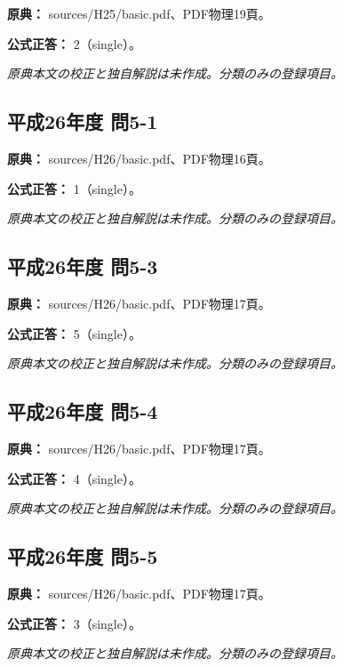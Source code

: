 \noindent\textbf{原典：} sources/H25/basic.pdf、PDF物理19頁。

\textbf{公式正答：} 2（single）。

\par\textit{原典本文の校正と独自解説は未作成。分類のみの登録項目。}

\subsection{平成26年度 問5-1}
\label{q:h26-reg-basic-5-1}

\noindent\textbf{原典：} sources/H26/basic.pdf、PDF物理16頁。

\textbf{公式正答：} 1（single）。

\par\textit{原典本文の校正と独自解説は未作成。分類のみの登録項目。}

\subsection{平成26年度 問5-3}
\label{q:h26-reg-basic-5-3}

\noindent\textbf{原典：} sources/H26/basic.pdf、PDF物理17頁。

\textbf{公式正答：} 5（single）。

\par\textit{原典本文の校正と独自解説は未作成。分類のみの登録項目。}

\subsection{平成26年度 問5-4}
\label{q:h26-reg-basic-5-4}

\noindent\textbf{原典：} sources/H26/basic.pdf、PDF物理17頁。

\textbf{公式正答：} 4（single）。

\par\textit{原典本文の校正と独自解説は未作成。分類のみの登録項目。}

\subsection{平成26年度 問5-5}
\label{q:h26-reg-basic-5-5}

\noindent\textbf{原典：} sources/H26/basic.pdf、PDF物理17頁。

\textbf{公式正答：} 3（single）。

\par\textit{原典本文の校正と独自解説は未作成。分類のみの登録項目。}

